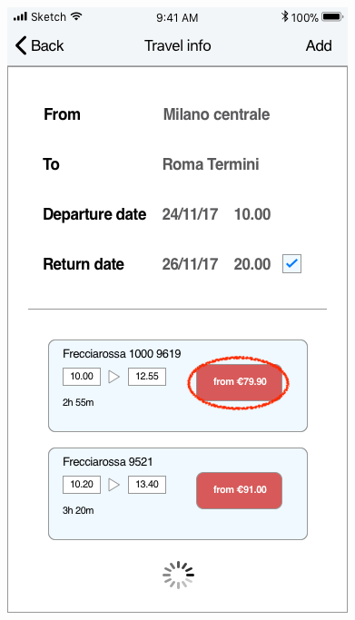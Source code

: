\begin{figure}[H]
	\centering
	\includegraphics[scale=0.23]{Images/Interface/Trips/11_departure}
	\hspace{0.5cm}

\end{figure}
